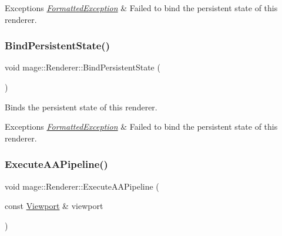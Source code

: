 \begin{DoxyExceptions}{Exceptions}
{\em \hyperlink{classmage_1_1_formatted_exception}{Formatted\+Exception}} & Failed to bind the persistent state of this renderer. \\
\hline
\end{DoxyExceptions}
\hypertarget{classmage_1_1_renderer_a0de9d7d913e5f92a75ff2cc075601b9d}{}\label{classmage_1_1_renderer_a0de9d7d913e5f92a75ff2cc075601b9d} 
\subsubsection{\texorpdfstring{Bind\+Persistent\+State()}{BindPersistentState()}}
{\footnotesize\ttfamily void mage\+::\+Renderer\+::\+Bind\+Persistent\+State (\begin{DoxyParamCaption}{ }\end{DoxyParamCaption})}

Binds the persistent state of this renderer.


\begin{DoxyExceptions}{Exceptions}
{\em \hyperlink{classmage_1_1_formatted_exception}{Formatted\+Exception}} & Failed to bind the persistent state of this renderer. \\
\hline
\end{DoxyExceptions}
\hypertarget{classmage_1_1_renderer_a30e9ae9fb0d9cd0f105f0fb2181d34b1}{}\label{classmage_1_1_renderer_a30e9ae9fb0d9cd0f105f0fb2181d34b1} 
\subsubsection{\texorpdfstring{Execute\+A\+A\+Pipeline()}{ExecuteAAPipeline()}}
{\footnotesize\ttfamily void mage\+::\+Renderer\+::\+Execute\+A\+A\+Pipeline (\begin{DoxyParamCaption}\item[{const \hyperlink{classmage_1_1_viewport}{Viewport} \&}]{viewport }\end{DoxyParamCaption})\hspace{0.3cm}{\ttfamily [private]}}

\hypertarget{classmage_1_1_renderer_a2a218f2947b17b5ebec1d49ff5ec194e}{}\label{classmage_1_1_renderer_a2a218f2947b17b5ebec1d49ff5ec194e} 
